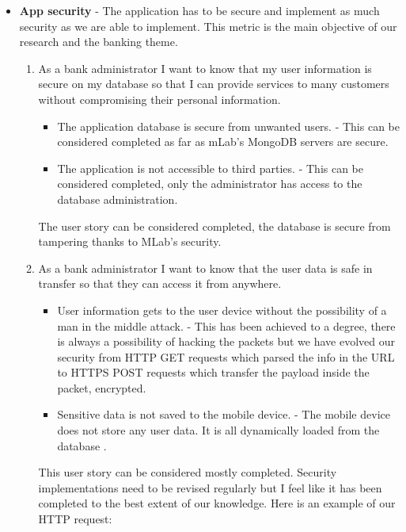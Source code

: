 \begin{itemize}
    \item  \textbf{App security} - The application has to be secure and implement as much security as we are able to implement. This metric is the main objective of our research and the banking theme.
        \begin{enumerate}
        \item As a bank administrator I want to know that my user information is secure on my database so that I can provide services to many customers without compromising their personal information.
        \begin{itemize}
                \item The application database is secure from unwanted users. - This can be considered completed as far as mLab's MongoDB servers are secure.
                \item The application is not accessible to third parties. - This can be considered completed, only the administrator has access to the database administration.
            \end{itemize}
            The user story can be considered completed, the database is secure from tampering thanks to MLab's security.
        \item As a bank administrator I want to know that the user data is safe in transfer so that they can access it from anywhere.
            \begin{itemize}
                \item User information gets to the user device without the possibility of a man in the middle attack. - This has been achieved to a degree, there is always a possibility of hacking the packets but we have evolved our security from HTTP GET requests which parsed the info in the URL to HTTPS POST requests which transfer the payload inside the packet, encrypted.
                \item Sensitive data is not saved to the mobile device. - The mobile device does not store any user data. It is all dynamically loaded from the database
.
            \end{itemize}
            This user story can be considered mostly completed. Security implementations need to be revised regularly but I feel like it has been completed to the best extent of our knowledge. 
            Here is an example of our HTTP request:
      

\end{enumerate}
\end{itemize}
